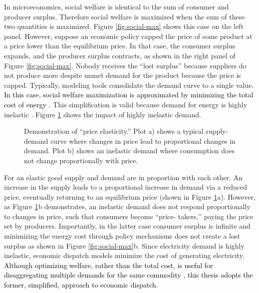 In microeconomics, social welfare is identical to the sum of consumer and
producer surplus. Therefore social welfare is maximized when the sum of these
two quantities is maximized. Figure \ref{fig:social-max} shows this case on the
left panel. However, suppose an economic policy capped the price of some product at a
price lower than the equilibrium price. In that case, the consumer surplus expands, and
the producer surplus contracts, as shown in the right panel of Figure
\ref{fig:social-max}. Nobody receives the ``lost surplus'' because suppliers do
not produce more despite unmet demand for the product because the price is
capped. Typically, modeling tools consolidate the demand curve to a single
value. \textcolor{black}{In this case, social welfare maximization is
approximated by minimizing the total cost of energy
\cite{richstein_cross-border_2014}}. This simplification is valid because demand
for energy is highly inelastic \cite{heuberger_power_2017, eia_price_2021,
labandeira_meta-analysis_2017, csereklyei_price_2020}. Figure
\ref{fig:inelastic} shows the impact of highly inelastic demand.

\begin{figure}[H]
  \centering
  \resizebox{\columnwidth}{!}{}
  \caption{Demonstration of ``price elasticity.'' Plot a) shows a typical supply-demand curve where changes in price lead to proportional changes in demand. Plot b) shows an inelastic demand where consumption does not change proportionally with price.}
  \label{fig:inelastic}
\end{figure}

For an elastic good supply and demand are in proportion with each other. An
increase in the supply leads to a proportional increase in demand via a reduced
price, eventually returning to an equilibrium price (shown in Figure
\ref{fig:inelastic}a). However, as Figure \ref{fig:inelastic}b demonstrates, an
inelastic demand does not respond proportionally to changes in price, such that
consumers become ``price- takers,'' paying the price set by producers.
Importantly, in the latter case consumer surplus is infinite and minimizing the
energy cost through policy mechanisms does not create a lost surplus as shown in
Figure \ref{fig:social-max}b. Since electricity demand is highly inelastic,
economic dispatch models minimize the cost of generating electricity.
\textcolor{black}{Although optimizing welfare, rather than the total cost, is
useful for disaggregating multiple demands for the same commodity
\cite{leuthold_elmod_2008}, this thesis adopts the former, simplified, approach
to economic dispatch.}

